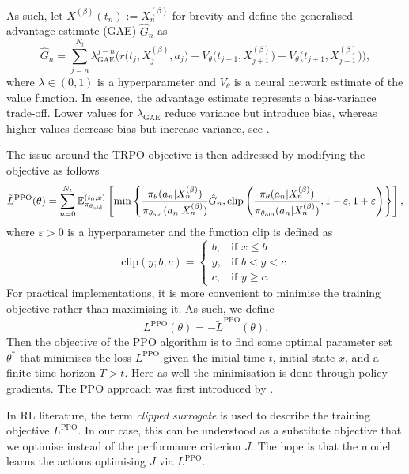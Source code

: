 As such, let $X^{(\beta)}(t_n) := X^{(\beta)}_n$ for brevity and define the generalised advantage estimate (GAE) $\hat G_n$ as
\begin{equation}
    \hat G_n = \sum_{j=n}^{N_t} \lambda_\text{GAE}^{j-n} \big(r\big(t_j,X_j^{(\beta)},a_j\big) + V_\theta \big(t_{j+1},X^{(\beta)}_{j+1}\big) - V_\theta \big(t_{j+1},X^{(\beta)}_{j+1}\big)\big),
    \label{eqn: GAE}
\end{equation}
where $\lambda \in (0,1)$ is a hyperparameter and $V_\theta$ is a neural network estimate of the value function. In essence, the advantage estimate represents a bias-variance trade-off. Lower values for $\lambda_\text{GAE}$ reduce variance but introduce bias, whereas higher values decrease bias but increase variance, see \cite{schulman2015high}. 

The issue around the TRPO objective is then addressed by modifying the objective as follows
\begin{align*}
    \tilde L^{\text{PPO}}(\theta) = \sum_{n=0}^{N_t} \mathbb{E}^{(t_0,x)}_{\pi_{\theta_\text{old}}} \left[ \min \left\{ \frac{\pi_\theta(a_n | X^{(\beta)}_n)}{\pi_{\theta_\text{old}}(a_n |X^{(\beta)}_n)} \hat G_n, \text{clip}\left( \frac{\pi_\theta(a_n | X^{(\beta)}_n)}{\pi_{\theta_\text{old}}(a_n |X^{(\beta)}_n)}, 1-\varepsilon, 1+\varepsilon \right)\right\} \right],
    \label{eqn: L-PPO-surrogate}
\end{align*}
where $\varepsilon>0$ is a hyperparameter and the function $\text{clip}$ is defined as
\begin{equation*}
    \text{clip}(y;b,c) = 
    \begin{cases}
        b, & \text{if } x \leq b \\
        y, & \text{if } b < y < c \\
        c, & \text{if } y \geq c.
    \end{cases}
\end{equation*} 
For practical implementations, it is more convenient to minimise the training objective rather than maximising it. As such, we define 
\begin{equation}
    L^{\text{PPO}}(\theta) = -\tilde L^{\text{PPO}}(\theta).
    \label{eqn: L-PPO-surrogate}
\end{equation}
Then the objective of the PPO algorithm is to find some optimal parameter set $\theta^*$ that minimises the loss $L^{\text{PPO}}$ given the initial time $t$, initial state $x$, and a finite time horizon $T>t$. Here as well the minimisation is done through policy gradients. The PPO approach was first introduced by \textcite{schulman2017proximal}.
\begin{remark}
    In RL literature, the term \emph{clipped surrogate} is used to describe the training objective $L^{\text{PPO}}$. In our case, this can be understood as a substitute objective that we optimise instead of the performance criterion $J$. The hope is that the model learns the actions optimising $J$ via $L^{\text{PPO}}$. 
\end{remark}

